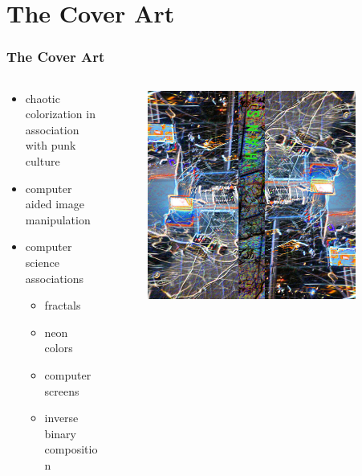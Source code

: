 \documentclass[mathserif,serif]{beamer}
\begin{document}
\section{The Cover Art}
\begin{frame}
\frametitle{The Cover Art}

\begin{columns}
    \begin{column}{0.48\textwidth}
        \begin{itemize}
        \item chaotic colorization in association with punk culture
        \item computer aided image manipulation
        \item computer science associations
        \begin{itemize}
        \item fractals
        \item neon colors
        \item computer screens
        \item inverse binary composition
        \end{itemize}
       	\end{itemize}
    \end{column}
    \begin{column}{0.48\textwidth}
        \begin{figure}[h!]
        \centering
        \includegraphics[width=0.9\textwidth]{hans_neon_1x2.jpg}
        \label{fig:cover_art}
        \end{figure}
    \end{column}
\end{columns}

\end{frame}
\end{document}

